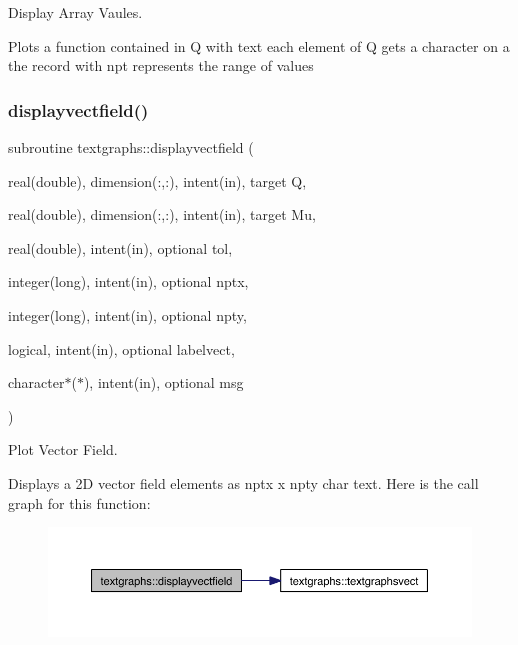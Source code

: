 Display Array Vaules. 

Plots a function contained in Q with text each element of Q gets a character on a the record with npt represents the range of values \mbox{\label{namespacetextgraphs_ae7171ed6f50b5b8b77aabd136316a6b8}} 
\subsubsection{\texorpdfstring{displayvectfield()}{displayvectfield()}}
{\footnotesize\ttfamily subroutine textgraphs\+::displayvectfield (\begin{DoxyParamCaption}\item[{real(double), dimension(\+:,\+:), intent(in), target}]{Q,  }\item[{real(double), dimension(\+:,\+:), intent(in), target}]{Mu,  }\item[{real(double), intent(in), optional}]{tol,  }\item[{integer(long), intent(in), optional}]{nptx,  }\item[{integer(long), intent(in), optional}]{npty,  }\item[{logical, intent(in), optional}]{labelvect,  }\item[{character$\ast$($\ast$), intent(in), optional}]{msg }\end{DoxyParamCaption})\hspace{0.3cm}{\ttfamily [private]}}



Plot Vector Field. 

Displays a 2D vector field elements as nptx x npty char text. Here is the call graph for this function\+:\nopagebreak
\begin{figure}[H]
\begin{center}
\leavevmode
\includegraphics[width=350pt]{namespacetextgraphs_ae7171ed6f50b5b8b77aabd136316a6b8_cgraph}
\end{center}
\end{figure}
\mbox{\label{namespacetextgraphs_a857fceafb9446a13966f54fbbce35773}} 
